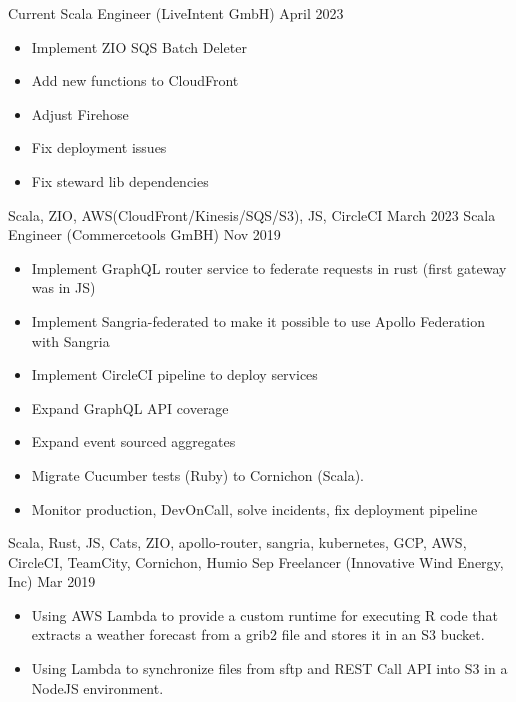 %
%
%
\begin{experiences}
\experience
    {Current}   {Scala Engineer (LiveIntent GmbH)}
    {April 2023} {
      \begin{itemize}
        \item Implement ZIO SQS Batch Deleter
        \item Add new functions to CloudFront
        \item Adjust Firehose
        \item Fix deployment issues
        \item Fix steward lib dependencies
      \end{itemize}
    }{Scala, ZIO, AWS(CloudFront/Kinesis/SQS/S3), JS, CircleCI}
  \emptySeparator
  \experience
    {March 2023}   {Scala Engineer (Commercetools GmBH)}
    {Nov 2019} {
      \begin{itemize}
        \item Implement GraphQL router service to federate requests in rust (first gateway was in JS)
        \item Implement Sangria-federated to make it possible to use Apollo Federation with Sangria
        \item Implement CircleCI pipeline to deploy services
        \item Expand GraphQL API coverage
        \item Expand event sourced aggregates
        \item Migrate Cucumber tests (Ruby) to Cornichon (Scala).
        \item Monitor production, DevOnCall, solve incidents, fix deployment pipeline
      \end{itemize}
    }{Scala, Rust, JS, Cats, ZIO, apollo-router, sangria, kubernetes, GCP, AWS, CircleCI, TeamCity, Cornichon, Humio}
  \emptySeparator
  \experience
    {Sep}   {Freelancer (Innovative Wind Energy, Inc)}
    {Mar 2019} {
      \begin{itemize}
        \item Using AWS Lambda to provide a custom runtime for executing R code that extracts a weather forecast from a grib2 file and stores it in an S3 bucket.
        \item Using Lambda to synchronize files from sftp and REST Call API into S3 in a NodeJS environment.

\end{itemize}}
\end{experiences}

